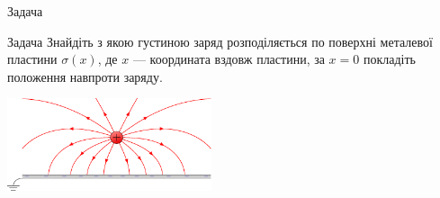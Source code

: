 \documentclass[onlytextwidth]{beamer}
\begin{document}
\begin{frame}{Задача}{}
       \begin{exampleblock}{Задача }
            Знайдіть з якою густиною заряд розподіляється по поверхні металевої пластини
            $\sigma(x)$, де $x$ --- координата вздовж пластини, за $x = 0$ покладіть положення
            навпроти заряду.
        \end{exampleblock}
		\begin{center}
			\includegraphics[width=6cm]{charge_near_plane.pdf}
		\end{center}
\end{frame}
\end{document}
